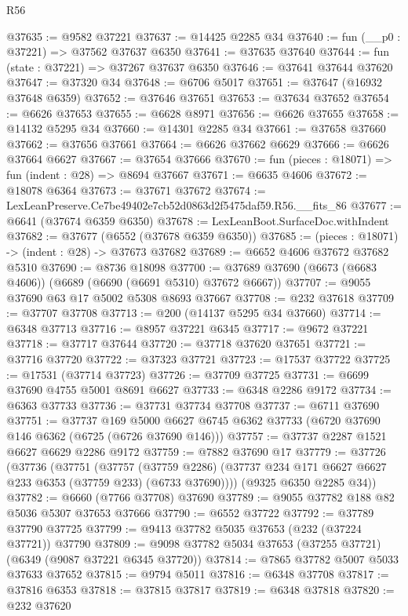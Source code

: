 \begin{lexlean}{R56}
\begin{coremodule}
@37635 := @9582 @37221
@37637 := @14425 @2285 @34
@37640 := fun (__p0 : @37221) => @37562 @37637 @6350
@37641 := @37635 @37640
@37644 := fun (state : @37221) => @37267 @37637 @6350
@37646 := @37641 @37644 @37620
@37647 := @37320 @34
@37648 := @6706 @5017
@37651 := @37647 (@16932 @37648 @6359)
@37652 := @37646 @37651
@37653 := @37634 @37652
@37654 := @6626 @37653
@37655 := @6628 @8971
@37656 := @6626 @37655
@37658 := @14132 @5295 @34
@37660 := @14301 @2285 @34
@37661 := @37658 @37660
@37662 := @37656 @37661
@37664 := @6626 @37662 @6629
@37666 := @6626 @37664 @6627
@37667 := @37654 @37666
@37670 := fun (pieces : @18071) => fun (indent : @28) => @8694 @37667
@37671 := @6635 @4606
@37672 := @18078 @6364
@37673 := @37671 @37672
@37674 := LexLeanPreserve.Ce7be49402e7cb52d0863d2f5475daf59.R56.__fits_86
@37677 := @6641 (@37674 @6359 @6350)
@37678 := LexLeanBoot.SurfaceDoc.withIndent
@37682 := @37677 (@6552 (@37678 @6359 @6350))
@37685 := (pieces : @18071) -> (indent : @28) -> @37673 @37682
@37689 := @6652 @4606 @37672 @37682 @5310
@37690 := @8736 @18098
@37700 := @37689 @37690 (@6673 (@6683 @4606)) (@6689 (@6690 (@6691 @5310) @37672 @6667))
@37707 := @9055 @37690 @63 @17 @5002 @5308 @8693 @37667
@37708 := @232 @37618
@37709 := @37707 @37708
@37713 := @200 (@14137 @5295 @34 @37660)
@37714 := @6348 @37713
@37716 := @8957 @37221 @6345
@37717 := @9672 @37221
@37718 := @37717 @37644
@37720 := @37718 @37620 @37651
@37721 := @37716 @37720
@37722 := @37323 @37721
@37723 := @17537 @37722
@37725 := @17531 (@37714 @37723)
@37726 := @37709 @37725
@37731 := @6699 @37690 @4755 @5001 @8691 @6627
@37733 := @6348 @2286 @9172
@37734 := @6363 @37733
@37736 := @37731 @37734 @37708
@37737 := @6711 @37690
@37751 := @37737
    @169
    @5000
    @6627
    @6745
    @6362
    @37733
    (@6720 @37690 @146 @6362 (@6725 (@6726 @37690 @146)))
@37757 := @37737 @2287 @1521 @6627 @6629 @2286 @9172
@37759 := @7882 @37690 @17
@37779 := @37726
    (@37736
      (@37751
        (@37757
          (@37759 @2286)
          (@37737 @234 @171 @6627 @6627 @233 @6353 (@37759 @233) (@6733 @37690))))
      (@9325 @6350 @2285 @34))
@37782 := @6660 (@7766 @37708) @37690
@37789 := @9055 @37782 @188 @82 @5036 @5307 @37653 @37666
@37790 := @6552 @37722
@37792 := @37789 @37790 @37725
@37799 := @9413 @37782 @5035 @37653 (@232 (@37224 @37721)) @37790
@37809 := @9098 @37782 @5034 @37653 (@37255 @37721) (@6349 (@9087 @37221 @6345 @37720))
@37814 := @7865 @37782 @5007 @5033 @37633 @37652
@37815 := @9794 @5011
@37816 := @6348 @37708
@37817 := @37816 @6353
@37818 := @37815 @37817
@37819 := @6348 @37818
@37820 := @232 @37620

\end{coremodule}
\end{lexlean}
